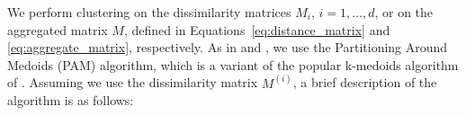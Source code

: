 \documentclass[12pt]{article}
\begin{document}
We perform clustering on the dissimilarity matrices $M_i$, $i = 1, \ldots, d$, or on the aggregated matrix $M$, defined in Equations~\eqref{eq:distance_matrix} and \eqref{eq:aggregate_matrix}, respectively.
As in \citet{Bernard2013} and \citet{Vignotto2021}, we use the Partitioning Around Medoids (PAM) algorithm, which is a variant of the popular k-medoids algorithm of \citet{Kaufman1987}.
Assuming we use the dissimilarity matrix $M^{(i)}$, a brief description of the algorithm is as follows:
\end{document}
